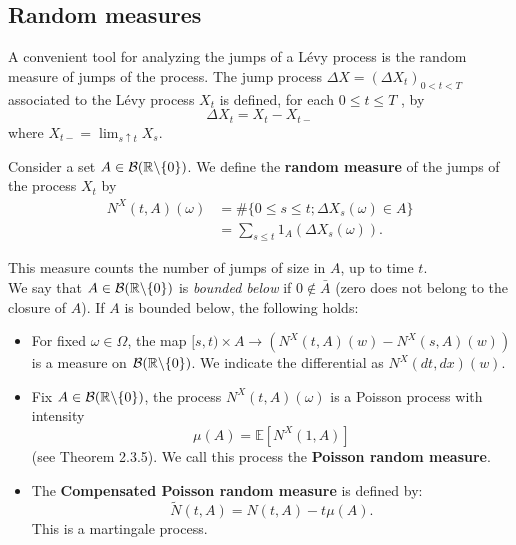 \subsection{Random measures}\label{random_measures}

A convenient tool for analyzing the jumps of a Lévy process is the random
measure of jumps of the process.
The jump process $\Delta X = (\Delta X_t)_{0<t<T}$ associated to the Lévy process $X_t$ is
defined, for each $0\leq t\leq T$ , by
\begin{equation}\label{jump}
 \Delta X_t = X_t - X_{t-}
\end{equation}
where $X_{t-} = \lim_{s\uparrow t} X_s $.\\ 
\begin{Definition}
Consider a set $A \in \mathcal{B}(\mathbb{R} \backslash \{ 0 \})$.
We define the \textbf{random measure} of the jumps of the process $X_t$ by
\begin{align}
 N^X(t,A)(\omega) &= \# \{ 0\leq s \leq t; \Delta X_s(\omega) \in A  \} \\
		   &= \sum_{s\leq t} 1_A(\Delta X_s(\omega)) . \nonumber
\end{align} 
\end{Definition}
This measure counts the number of jumps of size in $A$, up to time $t$.\\
We say that $A\in \mathcal{B}(\mathbb{R} \backslash \{ 0 \})$ is \emph{bounded below} if $0 \not \in \bar A$ (zero does not belong to the closure of $A$). 
If $A$ is bounded below, the following holds:
\begin{itemize}
 \item For fixed $\omega \in \Omega$, the map $[s,t) \times A \to (N^X(t,A)(w) - N^X(s,A)(w))$ is a measure on 
 $\mathcal{B}(\mathbb{R} \backslash \{ 0 \})$. We indicate the differential as $N^X(dt,dx)(w)$.
 \item Fix $A\in \mathcal{B}(\mathbb{R} \backslash \{ 0 \})$, the process $N^X(t,A)(\omega)$ is a Poisson process with intensity 
 \begin{equation}
 \mu(A) = \mathbb{E}[N^X(1,A) ] 
 \end{equation}
 (see \cite{Applebaum} 
 Theorem 2.3.5). We call this process the \textbf{Poisson random measure}.
 \item The \textbf{Compensated Poisson random measure} is defined by:
 \begin{equation}
  \tilde{N}(t,A) = N(t,A) - t\mu(A). 
 \end{equation}
This is a martingale process.
\end{itemize}
